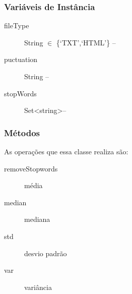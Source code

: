 \subsubsection{Variáveis de Instância}
\begin{description}
 \item  [fileType] String $\in$ \{`TXT',`HTML'\} -- 
 \item  [puctuation] String --
 \item  [stopWords] Set<string>--
 
\end{description}


\subsubsection{Métodos}
As operações que essa classe realiza são:
\begin{description}
    \item[removeStopwords] média 
    \item[median] mediana
    \item[std] desvio padrão
    \item[var] variância
\end{description}

